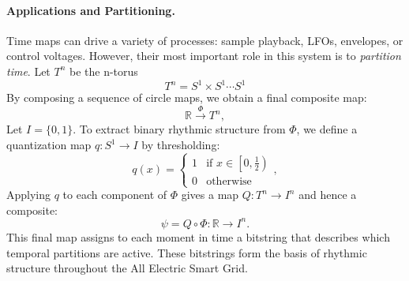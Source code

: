 \documentclass[12pt]{article}
\begin{document}
\paragraph{Applications and Partitioning.}  
Time maps can drive a variety of processes: sample playback, LFOs, envelopes, or control voltages.  
However, their most important role in this system is to \emph{partition time}.  
Let $T^n$ be the n-torus
\[
T^n = S^1 \times S^1 \cdots S^1
\]
By composing a sequence of circle maps, we obtain a final composite map:
\[
\mathbb{R} \xrightarrow{\Phi} T^n,
\]
Let $I=\{0,1\}$.  
To extract binary rhythmic structure from $\Phi$, we define a quantization map $q: S^1 \to I$ by thresholding:
\[
q(x) = \begin{cases} 1 & \text{if } x \in \left[0, \frac{1}{2}\right) \\ 0 & \text{otherwise} \end{cases},
\]
Applying $q$ to each component of $\Phi$ gives a map $Q: T^n \to I^n$ and hence a composite:
\[
\psi = Q \circ \Phi : \mathbb{R} \to I^n.
\]
This final map assigns to each moment in time a bitstring that describes which temporal partitions are active.  
These bitstrings form the basis of rhythmic structure throughout the All Electric Smart Grid.
\end{document}
